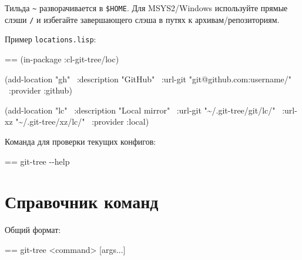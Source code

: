 \documentclass{book}
\makeatletter
\newenvironment{Texinfopreformatted}{%
  \par\GNUTobeylines\obeyspaces\frenchspacing\parskip=\z@\parindent=\z@}{}
{\catcode`\^^M=13 \gdef\GNUTobeylines{\catcode`\^^M=13 \def^^M{\null\par}}}
\newenvironment{Texinfoindented}{\begin{list}{}{}\item\relax}{\end{list}}
\renewcommand{\_}{\Texinfounderscore\discretionary{}{}{}}
\makeatother
\begin{document}
Тильда \texttt{\~{}} разворачивается в \texttt{\$HOME}. Для MSYS2/Windows используйте прямые слэши \texttt{/}
и избегайте завершающего слэша в путях к архивам/репозиториям.

Пример \texttt{locations.lisp}:
\begin{Texinfoindented}
\begin{Texinfopreformatted}%
\ttfamily (in-package :cl-git-tree/loc)

(add-location "gh"
\  :description "GitHub"
\  :url-git "git@github.com:username/"
\  :provider :github)

(add-location "lc"
\  :description "Local mirror"
\  :url-git "\~{}/.git-tree/git/lc/"
\  :url-xz "\~{}/.git-tree/xz/lc/"
\  :provider :local)
\end{Texinfopreformatted}
\end{Texinfoindented}

Команда для проверки текущих конфигов:
\begin{Texinfoindented}
\begin{Texinfopreformatted}%
\ttfamily git-tree {-}{-}help
\end{Texinfopreformatted}
\end{Texinfoindented}

\chapter{{Справочник команд}}
\label{anchor:_0421_043f_0440_0430_0432_043e_0447_043d_0438_043a-_043a_043e_043c_0430_043d_0434}%

Общий формат:
\begin{Texinfoindented}
\begin{Texinfopreformatted}%
\ttfamily git-tree <command> [args...]
\end{Texinfopreformatted}
\end{Texinfoindented}
\end{document}
